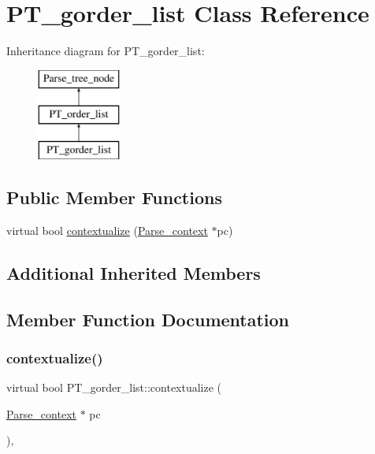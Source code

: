 \hypertarget{classPT__gorder__list}{}\section{P\+T\+\_\+gorder\+\_\+list Class Reference}
\label{classPT__gorder__list}
Inheritance diagram for P\+T\+\_\+gorder\+\_\+list\+:\begin{figure}[H]
\begin{center}
\leavevmode
\includegraphics[height=3.000000cm]{classPT__gorder__list}
\end{center}
\end{figure}
\subsection*{Public Member Functions}
\begin{DoxyCompactItemize}
\item 
virtual bool \mbox{\hyperlink{classPT__gorder__list_aee895e7250e73f670eccd71704b0c027}{contextualize}} (\mbox{\hyperlink{structParse__context}{Parse\+\_\+context}} $\ast$pc)
\end{DoxyCompactItemize}
\subsection*{Additional Inherited Members}


\subsection{Member Function Documentation}
\mbox{\label{classPT__gorder__list_aee895e7250e73f670eccd71704b0c027}} 
\subsubsection{\texorpdfstring{contextualize()}{contextualize()}}
{\footnotesize\ttfamily virtual bool P\+T\+\_\+gorder\+\_\+list\+::contextualize (\begin{DoxyParamCaption}\item[{\mbox{\hyperlink{structParse__context}{Parse\+\_\+context}} $\ast$}]{pc }\end{DoxyParamCaption})\hspace{0.3cm}{\ttfamily [inline]}, {\ttfamily [virtual]}}

